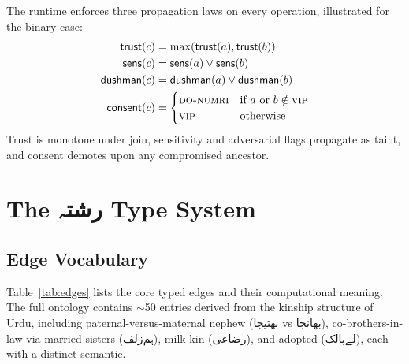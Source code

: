 \documentclass[10pt,twocolumn]{article}
\newcommand{\ur}[1]{{\urdufont #1}}
\begin{document}
The runtime enforces three propagation laws on every operation, illustrated for the binary case:
\begin{align*}
\mathsf{trust}(c)       &= \max(\mathsf{trust}(a), \mathsf{trust}(b)) \\
\mathsf{sens}(c)        &= \mathsf{sens}(a) \vee \mathsf{sens}(b) \\
\mathsf{dushman}(c)     &= \mathsf{dushman}(a) \vee \mathsf{dushman}(b) \\
\mathsf{consent}(c)     &= \begin{cases}
  \textsc{do-numri} & \text{if } a \text{ or } b \notin \textsc{vip} \\
  \textsc{vip} & \text{otherwise}
\end{cases}
\end{align*}
Trust is monotone under join, sensitivity and adversarial flags propagate as taint, and consent demotes upon any compromised ancestor.

\section{The \ur{رشتہ} Type System}
\label{sec:typesystem}

\subsection{Edge Vocabulary}

Table~\ref{tab:edges} lists the core typed edges and their computational meaning. The full ontology contains $\sim$50 entries derived from the kinship structure of Urdu, including paternal-versus-maternal nephew (\ur{بھتیجا} vs \ur{بھانجا}), co-brothers-in-law via married sisters (\ur{ہم‌زلف}), milk-kin (\ur{رضاعی}), and adopted (\ur{لے‌پالک}), each with a distinct semantic.
\end{document}
